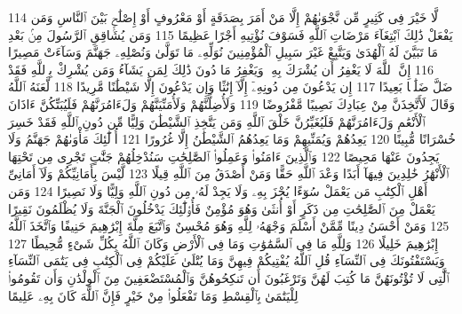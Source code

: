 {\tiny\colorbox{cl_aya}{114}} لَّا خَيْرَ فِى كَثِيرٍ مِّن نَّجْوَىٰهُمْ إِلَّا مَنْ أَمَرَ بِصَدَقَةٍ أَوْ مَعْرُوفٍ أَوْ إِصْلَٰحٍۭ بَيْنَ ٱلنَّاسِ وَمَن يَفْعَلْ ذَٰلِكَ ٱبْتِغَآءَ مَرْضَاتِ ٱللَّهِ فَسَوْفَ نُؤْتِيهِ أَجْرًا عَظِيمًا
{\tiny\colorbox{cl_aya}{115}} وَمَن يُشَاقِقِ ٱلرَّسُولَ مِنۢ بَعْدِ مَا تَبَيَّنَ لَهُ ٱلْهُدَىٰ وَيَتَّبِعْ غَيْرَ سَبِيلِ ٱلْمُؤْمِنِينَ نُوَلِّهِۦ مَا تَوَلَّىٰ وَنُصْلِهِۦ جَهَنَّمَ وَسَآءَتْ مَصِيرًا
{\tiny\colorbox{cl_aya}{116}} إِنَّ ٱللَّهَ لَا يَغْفِرُ أَن يُشْرَكَ بِهِۦ وَيَغْفِرُ مَا دُونَ ذَٰلِكَ لِمَن يَشَآءُ وَمَن يُشْرِكْ بِٱللَّهِ فَقَدْ ضَلَّ ضَلَٰلًۢا بَعِيدًا
{\tiny\colorbox{cl_aya}{117}} إِن يَدْعُونَ مِن دُونِهِۦٓ إِلَّآ إِنَٰثًا وَإِن يَدْعُونَ إِلَّا شَيْطَٰنًا مَّرِيدًا
{\tiny\colorbox{cl_aya}{118}} لَّعَنَهُ ٱللَّهُ وَقَالَ لَأَتَّخِذَنَّ مِنْ عِبَادِكَ نَصِيبًا مَّفْرُوضًا
{\tiny\colorbox{cl_aya}{119}} وَلَأُضِلَّنَّهُمْ وَلَأُمَنِّيَنَّهُمْ وَلَءَامُرَنَّهُمْ فَلَيُبَتِّكُنَّ ءَاذَانَ ٱلْأَنْعَٰمِ وَلَءَامُرَنَّهُمْ فَلَيُغَيِّرُنَّ خَلْقَ ٱللَّهِ وَمَن يَتَّخِذِ ٱلشَّيْطَٰنَ وَلِيًّا مِّن دُونِ ٱللَّهِ فَقَدْ خَسِرَ خُسْرَانًا مُّبِينًا
{\tiny\colorbox{cl_aya}{120}} يَعِدُهُمْ وَيُمَنِّيهِمْ وَمَا يَعِدُهُمُ ٱلشَّيْطَٰنُ إِلَّا غُرُورًا
{\tiny\colorbox{cl_aya}{121}} أُو۟لَٰٓئِكَ مَأْوَىٰهُمْ جَهَنَّمُ وَلَا يَجِدُونَ عَنْهَا مَحِيصًا
{\tiny\colorbox{cl_aya}{122}} وَٱلَّذِينَ ءَامَنُوا۟ وَعَمِلُوا۟ ٱلصَّٰلِحَٰتِ سَنُدْخِلُهُمْ جَنَّٰتٍ تَجْرِى مِن تَحْتِهَا ٱلْأَنْهَٰرُ خَٰلِدِينَ فِيهَآ أَبَدًا وَعْدَ ٱللَّهِ حَقًّا وَمَنْ أَصْدَقُ مِنَ ٱللَّهِ قِيلًا
{\tiny\colorbox{cl_aya}{123}} لَّيْسَ بِأَمَانِيِّكُمْ وَلَآ أَمَانِىِّ أَهْلِ ٱلْكِتَٰبِ مَن يَعْمَلْ سُوٓءًا يُجْزَ بِهِۦ وَلَا يَجِدْ لَهُۥ مِن دُونِ ٱللَّهِ وَلِيًّا وَلَا نَصِيرًا
{\tiny\colorbox{cl_aya}{124}} وَمَن يَعْمَلْ مِنَ ٱلصَّٰلِحَٰتِ مِن ذَكَرٍ أَوْ أُنثَىٰ وَهُوَ مُؤْمِنٌ فَأُو۟لَٰٓئِكَ يَدْخُلُونَ ٱلْجَنَّةَ وَلَا يُظْلَمُونَ نَقِيرًا
{\tiny\colorbox{cl_aya}{125}} وَمَنْ أَحْسَنُ دِينًا مِّمَّنْ أَسْلَمَ وَجْهَهُۥ لِلَّهِ وَهُوَ مُحْسِنٌ وَٱتَّبَعَ مِلَّةَ إِبْرَٰهِيمَ حَنِيفًا وَٱتَّخَذَ ٱللَّهُ إِبْرَٰهِيمَ خَلِيلًا
{\tiny\colorbox{cl_aya}{126}} وَلِلَّهِ مَا فِى ٱلسَّمَٰوَٰتِ وَمَا فِى ٱلْأَرْضِ وَكَانَ ٱللَّهُ بِكُلِّ شَىْءٍ مُّحِيطًا
{\tiny\colorbox{cl_aya}{127}} وَيَسْتَفْتُونَكَ فِى ٱلنِّسَآءِ قُلِ ٱللَّهُ يُفْتِيكُمْ فِيهِنَّ وَمَا يُتْلَىٰ عَلَيْكُمْ فِى ٱلْكِتَٰبِ فِى يَتَٰمَى ٱلنِّسَآءِ ٱلَّٰتِى لَا تُؤْتُونَهُنَّ مَا كُتِبَ لَهُنَّ وَتَرْغَبُونَ أَن تَنكِحُوهُنَّ وَٱلْمُسْتَضْعَفِينَ مِنَ ٱلْوِلْدَٰنِ وَأَن تَقُومُوا۟ لِلْيَتَٰمَىٰ بِٱلْقِسْطِ وَمَا تَفْعَلُوا۟ مِنْ خَيْرٍ فَإِنَّ ٱللَّهَ كَانَ بِهِۦ عَلِيمًا
